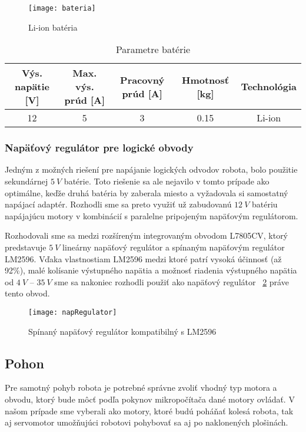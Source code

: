 \begin{figure}[h]
\centering
\texttt{[image: bateria]}
\caption{Li-ion batéria}
\label{fig:bateria}
\end{figure}


\bgroup
\def\arraystretch{1.8}
\begin{table}[h]
\centering
\begin{tabular}{|c|c|c|c|c|}
\hline
Výs. napätie [V] & Max. výs. prúd [A] & Pracovný prúd [A]  & Hmotnosť [kg]&Technológia\\
\hline
 12& 5 & 3  & 0.15& Li-ion \\
\hline
\end{tabular}
\caption{Parametre batérie}
\label{tab:bateria}
\end{table}
\egroup

\subsubsection{Napäťový regulátor pre logické obvody}
Jedným z možných riešení pre napájanie logických odvodov robota, bolo použitie sekundárnej $5~V$ batérie. Toto riešenie sa ale nejavilo v tomto prípade ako optimálne, keďže druhá batéria by zaberala miesto a vyžadovala si samostatný napájací adaptér. Rozhodli sme sa preto využiť už zabudovanú $12~V$ batériu napájajúcu motory v kombinácií s paralelne pripojeným napäťovým regulátorom. 

Rozhodovali sme sa medzi rozšíreným integrovaným obvodom L7805CV, ktorý predstavuje $5~V$ lineárny napäťový regulátor a spínaným napäťovým regulátor LM2596. Vďaka vlastnostiam LM2596 medzi ktoré patrí vysoká účinnosť (až 92\%), malé kolísanie výstupného napätia a možnosť riadenia výstupného napätia od $4~V$ – $35~V$ sme sa nakoniec rozhodli použiť ako napäťový regulátor \figurename~\ref{fig:napRegulator} práve tento obvod.

\begin{figure}[h!]
\centering
\texttt{[image: napRegulator]}
\caption{Spínaný napäťový regulátor kompatibilný s LM2596}
\label{fig:napRegulator}
\end{figure}

\subsection{Pohon}
Pre samotný pohyb robota je potrebné správne zvoliť vhodný typ motora a obvodu, ktorý bude môcť podľa pokynov mikropočítača dané motory ovládať. V našom prípade sme vyberali ako motory, ktoré budú poháňať kolesá robota, tak aj servomotor umožňujúci robotovi pohybovať sa aj po naklonených plošinách.


